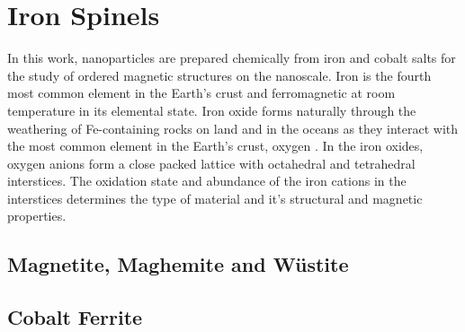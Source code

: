 \documentclass[\main/dresen_thesis.tex]{subfiles}
\renewcommand{\thisPath}{\main/chapters/theoreticalBackground/ferrites}
\begin{document}
  \section{Iron Spinels}
  In this work, nanoparticles are prepared chemically from iron and cobalt salts for the study of ordered magnetic structures on the nanoscale.
  Iron is the fourth most common element in the Earth's crust and ferromagnetic at room temperature in its elemental state.
  Iron oxide forms naturally through the weathering of Fe-containing rocks on land and in the oceans as they interact with the most common element in the Earth's crust, oxygen \cite{Parkinson_2016_Irono}.
  In the iron oxides, oxygen anions  form a close packed lattice with octahedral and tetrahedral interstices.
  The oxidation state and abundance of the iron cations in the interstices determines the type of material and it's structural and magnetic properties.

  \subsection{Magnetite, Maghemite and W\"ustite}\label{ch:theoreticalBackground:maghemite}
    

  \subsection{Cobalt Ferrite}\label{ch:theoreticalBackground:cobaltferrite}
    
\end{document}
